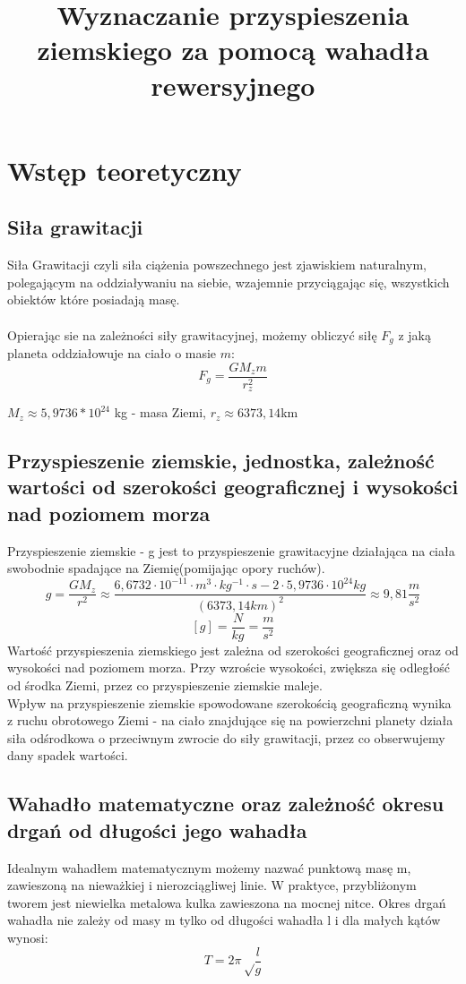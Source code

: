 \documentclass{article}
\begin{document}
\title{\huge\bfseries Wyznaczanie przyspieszenia ziemskiego za pomocą wahadła rewersyjnego}
\date{}
\author{}
\maketitle
\section{Wstęp teoretyczny}
\subsection{Siła grawitacji}
Siła Grawitacji czyli siła ciążenia powszechnego jest zjawiskiem naturalnym, polegającym na oddziaływaniu na siebie, wzajemnie przyciągając się,  wszystkich obiektów które posiadają masę.\\\\
	Opierając sie na zależności siły grawitacyjnej, możemy obliczyć siłę $F_g$ z jaką planeta oddziałowuje na ciało o masie $m$:
	$$F_g = \frac{GM_zm}{{r_z^2}}$$
	 \begin{center}
	 $M_z \approx 5,9736 * 10^{24}$ kg - masa Ziemi, $r_z \approx 6373,14$km
	 \end{center}
\subsection{Przyspieszenie ziemskie, jednostka, zależność wartości od szerokości geograficznej i wysokości nad poziomem morza}
Przyspieszenie ziemskie - g jest to przyspieszenie grawitacyjne działająca na ciała swobodnie spadające na Ziemię(pomijając opory ruchów). 
$$g = \frac{GM_z}{r^2} \approx \frac{6,6732 \cdot 10^{-11} \cdot m^3\cdot kg^{-1}\cdot s-2 \cdot 5,9736 \cdot 10^{24}kg}{(6373,14km)^2} \approx 9,81 \frac{m}{s^2}$$
$$[g] = \frac{N}{kg} = \frac{m}{s^2}$$
Wartość przyspieszenia ziemskiego jest zależna od szerokości geograficznej oraz od wysokości nad poziomem morza. Przy wzroście wysokości, zwiększa się odległość od środka Ziemi, przez co przyspieszenie ziemskie maleje.\\
Wpływ na przyspieszenie ziemskie spowodowane szerokością geograficzną wynika z ruchu obrotowego Ziemi - na ciało znajdujące się na powierzchni planety działa siła odśrodkowa o przeciwnym zwrocie do siły grawitacji, przez co obserwujemy dany spadek wartości.
\subsection{Wahadło matematyczne oraz zależność okresu drgań od długości jego wahadła}
Idealnym wahadłem matematycznym możemy nazwać punktową masę m, zawieszoną na nieważkiej i nierozciągliwej linie. W praktyce, przybliżonym tworem jest niewielka metalowa kulka zawieszona na mocnej nitce. Okres drgań wahadła nie zależy od masy m tylko od długości wahadła l i dla małych kątów wynosi:
$$T = 2\pi \sqrt\frac{l}{g}$$
\end{document}
